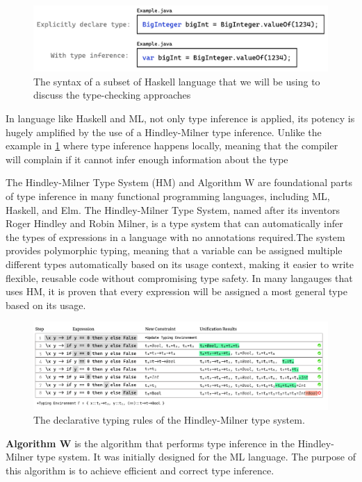 \begin{figure}[hbt]
  \includegraphics[width=\linewidth]{ExampleJava}
  \caption{
    \label{fig:example-java}
    The syntax of a subset of Haskell language that we will be using to discuss the type-checking approaches
    }
\end{figure}

In language like Haskell and ML, not only type inference is applied, its potency is hugely amplified by the use of a Hindley-Milner type inference. Unlike the example in  \ref{fig:example-java} where type inference happens locally, meaning that the compiler will complain if it cannot infer enough information about the type\

The Hindley-Milner Type System (HM) and Algorithm W are foundational parts of type inference in many functional programming languages, including ML, Haskell, and Elm. The Hindley-Milner Type System, named after its inventors Roger Hindley and Robin Milner, is a type system that can automatically infer the types of expressions in a language with no annotations required.The system provides polymorphic typing, meaning that a variable can be assigned multiple different types automatically based on its usage context, making it easier to write flexible, reusable code without compromising type safety. In many langauges that uses HM, it is proven that every expression will be assigned a most general type based on its usage. 



\begin{figure}[hbt]
    \includegraphics[width=0.5\linewidth]{HindleyMilner}
    \caption{
        The declarative typing rules of the Hindley-Milner type system.}
\end{figure}



\textbf{Algorithm W} is the algorithm that performs type inference in the Hindley-Milner type system. It was initially designed for the ML language. The purpose of this algorithm is to achieve efficient and correct type inference.


